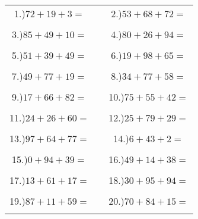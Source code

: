\documentclass{article}
\begin{document}
\begin{tabular}{ccc}
1.)$72+19+3=$& \hspace{5cm} &2.)$53+68+72=$\\\\
3.)$85+49+10=$& \hspace{5cm} &4.)$80+26+94=$\\\\
5.)$51+39+49=$& \hspace{5cm} &6.)$19+98+65=$\\\\
7.)$49+77+19=$& \hspace{5cm} &8.)$34+77+58=$\\\\
9.)$17+66+82=$& \hspace{5cm} &10.)$75+55+42=$\\\\
11.)$24+26+60=$& \hspace{5cm} &12.)$25+79+29=$\\\\
13.)$97+64+77=$& \hspace{5cm} &14.)$6+43+2=$\\\\
15.)$0+94+39=$& \hspace{5cm} &16.)$49+14+38=$\\\\
17.)$13+61+17=$& \hspace{5cm} &18.)$30+95+94=$\\\\
19.)$87+11+59=$& \hspace{5cm} &20.)$70+84+15=$\\\\
\end{tabular}
\newpage
\end{document}
